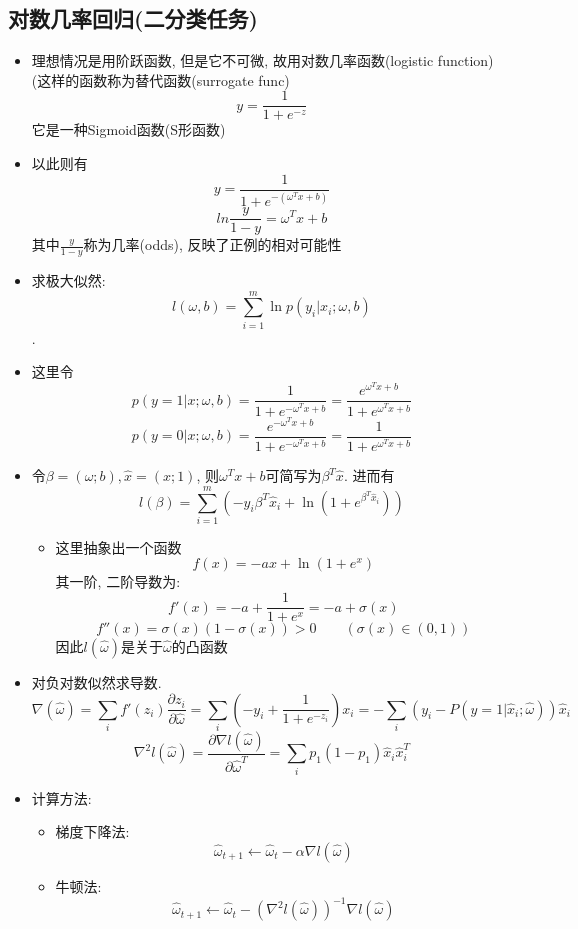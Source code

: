 \documentclass[UTF8]{article}
\newcommand{\partialx}[2]{\frac{\partial #1}{\partial #2}}
\begin{document}
\subsection{对数几率回归(二分类任务)}
\begin{itemize}
\item 理想情况是用阶跃函数, 但是它不可微, 故用对数几率函数(logistic function)(这样的函数称为替代函数(surrogate func)$$y=\frac{1}{1+e^{-z}}$$
它是一种Sigmoid函数(S形函数)
\item 以此则有
$$y=\frac{1}{1+e^{-(\omega^Tx+b)}}$$
$$ln\frac{y}{1-y}=\omega^Tx+b$$
其中$\frac{y}{1-y}$称为几率(odds), 反映了正例的相对可能性
\item 求极大似然:$$l(\omega,b)=\sum\limits_{i=1}^m\ln p(y_i|x_i;\omega,b)$$.
\item 这里令$$p(y=1|x;\omega,b)=\frac{1}{1+e^{-\omega^Tx+b}}=\frac{e^{\omega^Tx+b}}{1+e^{\omega^Tx+b}}$$
$$p(y=0|x;\omega,b)=\frac{e^{-\omega^Tx+b}}{1+e^{-\omega^Tx+b}}=\frac{1}{1+e^{\omega^Tx+b}}$$
\item 令$\beta=(\omega;b),\hat{x}=(x;1)$, 则$\omega^Tx+b$可简写为$\beta^T\hat{x}$. 进而有
$$l(\beta)=\sum\limits_{i=1}^m(-y_i\beta^T\hat{x}_i+\ln(1+e^{\beta^T\hat{x}_i}))$$
	\begin{itemize}
	\item 这里抽象出一个函数$$f(x)=-ax+\ln(1+e^x)$$
	其一阶, 二阶导数为:
	$$f'(x)=-a+\frac{1}{1+e^x}=-a+\sigma(x)$$
	$$f''(x)=\sigma(x)(1-\sigma(x))>0\qquad(\sigma(x)\in(0,1))$$
	因此$l(\hat{\omega})$是关于$\hat{\omega}$的凸函数
	\end{itemize}
\item 对负对数似然求导数. $$\nabla(\hat{\omega})=\sum\limits_{i}f'(z_i)\partialx{z_i}{\hat{\omega}}=\sum\limits_i\left(-y_i+\frac{1}{1+e^{-z_i}}\right)x_i=-\sum\limits_i\left(y_i-P(y=1|\hat{x}_i;\hat{\omega})\right)\hat{x}_i$$
$$\nabla^2l(\hat{\omega})=\partialx{\nabla l(\hat{\omega})}{\hat{\omega}^T}=\sum\limits_ip_1(1-p_1)\hat{x}_i\hat{x}^T_i$$
\item 计算方法:
	\begin{itemize}
	\item 梯度下降法:
	$$\hat{\omega}_{t+1}\leftarrow \hat{\omega}_t-\alpha\nabla l(\hat{\omega})$$
	\item 牛顿法:
	$$\hat{\omega}_{t+1}\leftarrow \hat{\omega}_t-(\nabla^2l(\hat{\omega}))^{-1}\nabla l(\hat{\omega})$$
	\end{itemize}
\end{itemize}
\end{document}
